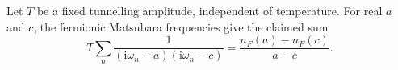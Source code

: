 \documentclass{article}
\begin{document}
Let $T$ be a fixed tunnelling amplitude, independent of temperature.  For
real $a$ and $c$, the fermionic Matsubara frequencies give the claimed sum
\begin{equation}
T \sum_n \frac{1}{(\mathrm{i}\omega_n-a)(\mathrm{i}\omega_n-c)}
= \frac{n_F(a)-n_F(c)}{a-c} .
\label{eq:transfer-sum}
\end{equation}
\end{document}
